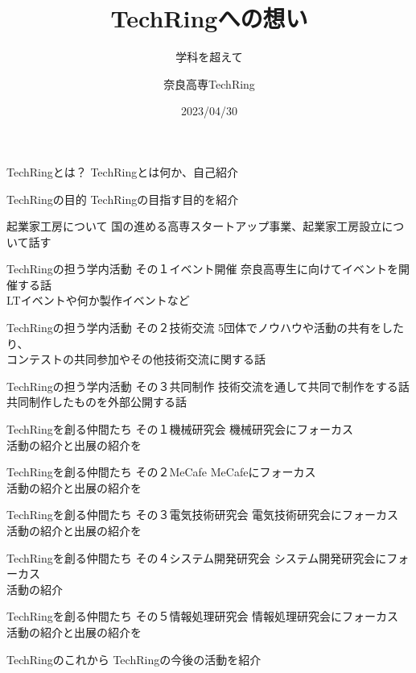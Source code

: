 \documentclass[dvipdfmx]{beamer}
\title{TechRingへの想い}
\subtitle{学科を超えて}
\author[TechRing]{奈良高専TechRing}
\date[2023/04/30]{2023/04/30}
\begin{document}
\maketitle

\begin{frame}{TechRingとは？}
  TechRingとは何か、自己紹介
\end{frame}

\begin{frame}{TechRingの目的}
  TechRingの目指す目的を紹介
\end{frame}

\begin{frame}{起業家工房について}
  国の進める高専スタートアップ事業、起業家工房設立について話す
\end{frame}

\begin{frame}{TechRingの担う学内活動 その１}{イベント開催}
  奈良高専生に向けてイベントを開催する話\\
  LTイベントや何か製作イベントなど
\end{frame}

\begin{frame}{TechRingの担う学内活動 その２}{技術交流}
  5団体でノウハウや活動の共有をしたり、\\
  コンテストの共同参加やその他技術交流に関する話
\end{frame}

\begin{frame}{TechRingの担う学内活動 その３}{共同制作}
  技術交流を通して共同で制作をする話\\
  共同制作したものを外部公開する話
\end{frame}

\begin{frame}{TechRingを創る仲間たち その１}{機械研究会}
  機械研究会にフォーカス\\
  活動の紹介と出展の紹介を
\end{frame}

\begin{frame}{TechRingを創る仲間たち その２}{MeCafe}
  MeCafeにフォーカス\\
  活動の紹介と出展の紹介を
\end{frame}

\begin{frame}{TechRingを創る仲間たち その３}{電気技術研究会}
  電気技術研究会にフォーカス\\
  活動の紹介と出展の紹介を
\end{frame}

\begin{frame}{TechRingを創る仲間たち その４}{システム開発研究会}
  システム開発研究会にフォーカス\\
  活動の紹介
\end{frame}

\begin{frame}{TechRingを創る仲間たち その５}{情報処理研究会}
  情報処理研究会にフォーカス\\
  活動の紹介と出展の紹介を
\end{frame}

\begin{frame}{TechRingのこれから}
  TechRingの今後の活動を紹介
\end{frame}
\end{document}
